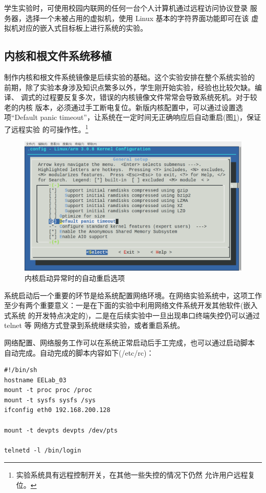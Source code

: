 \documentclass[nofonts]{ctexart}
\begin{document}
    学生实验时，可使用校园内联网的任何一台个人计算机通过远程访问协议登录
服务器，选择一个未被占用的虚拟机，使用 Linux 基本的字符界面功能即可在该
虚拟机对应的嵌入式目标板上进行系统的实验。

\subsection{内核和根文件系统移植}
	制作内核和根文件系统镜像是后续实验的基础。这个实验安排在整个系统实验的
前期，除了实验本身涉及知识点繁多以外，学生刚开始实验，经验也比较欠缺。编译、
调式的过程要反复多次，错误的内核镜像文件常常会导致系统死机。对于较老的内核
版本，必须通过手工断电复位。新版内核配置中，可以通过设置选项``Default panic
timeout''，让系统在一定时间无正确响应后自动重启(图\ref{fig5})，保证了远程实验
的可操作性。\footnote{实验系统具有远程控制开关，在其他一些失控的情况下仍然
允许用户远程复位。}

\begin{figure}[!h]
\centering
\includegraphics[width=.8\textwidth]{menu1}
\caption{内核启动异常时的自动重启选项}\label{fig5}
\end{figure}

	系统启动后一个重要的环节是给系统配置网络环境。在网络实验系统中，这项工作
至少有两个重要意义：一是在下面的实验中利用网络文件系统开发其他软件(嵌入式系统
的开发特点决定的)，二是在后续实验中一旦出现串口终端失控仍可以通过 telnet 等
网络方式登录到系统继续实验，或者重启系统。

	网络配置、网络服务工作可以在系统正常启动后手工完成，也可以通过启动脚本
自动完成。自动完成的脚本内容如下(/etc/rc)：

\begin{boxedminipage}{.9\textwidth}
\begin{verbatim}
#!/bin/sh
hostname EELab_03
mount -t proc proc /proc
mount -t sysfs sysfs /sys
ifconfig eth0 192.168.200.128

mount -t devpts devpts /dev/pts

telnetd -l /bin/login
\end{verbatim}
\end{boxedminipage}
\end{document}
